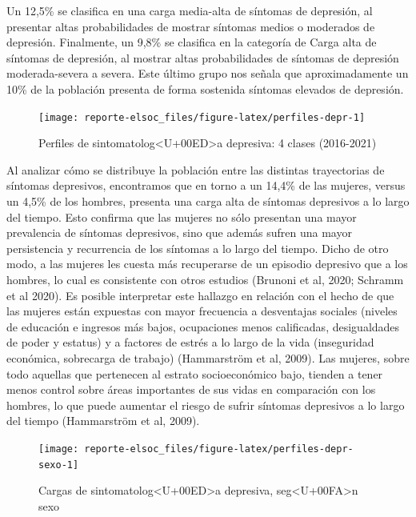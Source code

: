 \documentclass[
  12pt,
]{book}
\begin{document}
Un 12,5\% se clasifica en una carga media-alta de síntomas de depresión, al presentar altas probabilidades de mostrar síntomas medios o moderados de depresión. Finalmente, un 9,8\% se clasifica en la categoría de Carga alta de síntomas de depresión, al mostrar altas probabilidades de síntomas de depresión moderada-severa a severa. Este último grupo nos señala que aproximadamente un 10\% de la población presenta de forma sostenida síntomas elevados de depresión.

\begin{figure}

{\centering \texttt{[image: reporte-elsoc\_files/figure-latex/perfiles-depr-1]} 

}

\caption{Perfiles de sintomatolog<U+00ED>a depresiva: 4 clases (2016-2021)}\label{fig:perfiles-depr}
\end{figure}

Al analizar cómo se distribuye la población entre las distintas trayectorias de síntomas depresivos, encontramos que en torno a un 14,4\% de las mujeres, versus un 4,5\% de los hombres, presenta una carga alta de síntomas depresivos a lo largo del tiempo. Esto confirma que las mujeres no sólo presentan una mayor prevalencia de síntomas depresivos, sino que además sufren una mayor persistencia y recurrencia de los síntomas a lo largo del tiempo. Dicho de otro modo, a las mujeres les cuesta más recuperarse de un episodio depresivo que a los hombres, lo cual es consistente con otros estudios (Brunoni et al, 2020; Schramm et al 2020). Es posible interpretar este hallazgo en relación con el hecho de que las mujeres están expuestas con mayor frecuencia a desventajas sociales (niveles de educación e ingresos más bajos, ocupaciones menos calificadas, desigualdades de poder y estatus) y a factores de estrés a lo largo de la vida (inseguridad económica, sobrecarga de trabajo) (Hammarström et al, 2009). Las mujeres, sobre todo aquellas que pertenecen al estrato socioeconómico bajo, tienden a tener menos control sobre áreas importantes de sus vidas en comparación con los hombres, lo que puede aumentar el riesgo de sufrir síntomas depresivos a lo largo del tiempo (Hammarström et al, 2009).

\begin{figure}

{\centering \texttt{[image: reporte-elsoc\_files/figure-latex/perfiles-depr-sexo-1]} 

}

\caption{Cargas de sintomatolog<U+00ED>a depresiva, seg<U+00FA>n sexo}\label{fig:perfiles-depr-sexo}
\end{figure}
\end{document}
